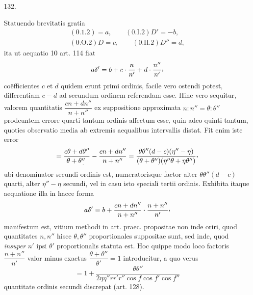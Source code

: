 \par{}\medskip
\begin{center}\hypertarget{native-179}{}\hypertarget{native-179-article132}{}132.\end{center}
Statuendo brevitatis gratia
\[
\begin{gathered}
(0.1.2)=a,\qquad (0.\mathrm{I}.2)D'=-b,\\
(0.\mathrm{O}.2)D=c,\qquad (0.\mathrm{II}.2)D''=d,
\end{gathered}
\]
ita ut aequatio 10 art. 114 fiat
\[
a\delta'=b+c\cdot\frac{n}{n'}+d\cdot\frac{n''}{n'}\mathpunct{\raisebox{.45ex}{,}}
\]
coëfficientes $c$ et $d$ quidem erunt primi ordinis, facile vero ostendi potest,
differentiam $c-d$ ad secundum ordinem referendam esse. Hinc vero sequitur,
valorem quantitatis $\dfrac{cn+dn''}{n+n''}$ ex suppositione approximata $n:n''=\theta:\theta''$ prodeuntem
errore quarti tantum ordinis affectum esse, quin adeo quinti tantum, quoties
observatio media ab extremis aequalibus intervallis distat. Fit enim iste error
\[
=\frac{c\theta+d\theta''}{\theta+\theta''\mathpunct{\mkern-8mu\raisebox{-.65ex}{.}\mkern8mu}}
-\frac{cn+dn''}{n+n''}
=\frac{\theta\theta''(d-c)(\eta''-\eta)}{(\theta+\theta'')(\eta''\theta+\eta\theta'')}\mathpunct{\raisebox{.45ex}{,}}
\]
ubi denominator secundi ordinis est, numeratorisque factor alter $\theta\theta''(d-c)$
quarti, alter $\eta''-\eta$ secundi, vel in casu isto speciali tertii ordinis. Exhibita
itaque aequatione illa in hacce forma
\[
a\delta'=b+\frac{cn+dn''}{n+n''}\cdot\frac{n+n''}{n'}\mathpunct{\raisebox{.45ex}{,}}
\]
manifestum est, vitium methodi in art. praec. propositae non inde oriri, quod
quantitates $n,n''$ hisce $\theta,\theta''$ proportionales suppositae sunt, sed inde, quod
\textit{insuper} $n'$ ipsi $\theta'$ proportionalis statuta est. Hoc quippe modo loco factoris
$\dfrac{n+n''}{n'}$ valor minus exactus $\dfrac{\theta+\theta''}{\theta'}=1$ introducitur, a quo verus
\[
=1+\frac{\theta\theta''}{2\eta\eta''rr'r''\cos f\cos f'\cos f''}
\]
quantitate ordinis secundi discrepat (art. 128).
